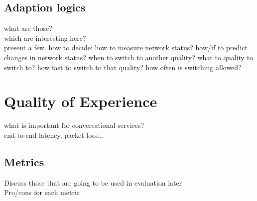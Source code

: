 \subsection{Adaption logics}
what are those? \\
which are interesting here? \\
present a few. 
how to decide:
	how to measure network status?
	how/if to predict changes in network status?
	when to switch to another quality?
	what to quality to switch to?
	how fast to switch to that quality?
	how often is switching allowed?
	

\section{Quality of Experience}
what is important for conversational services? \\
end-to-end latency, packet loss...

\subsection{Metrics}
Discuss those that are going to be used in evaluation later \\
Pro/cons for each metric

